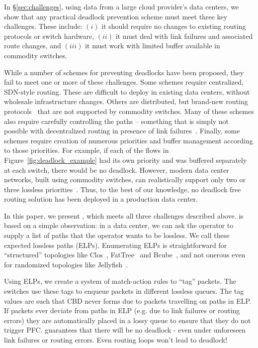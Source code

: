 In \S\ref{sec:challenges}, using data from a large cloud provider's data
centers, we show that any practical deadlock prevention scheme must meet three
key challenges. These include: $(i)$ it should require no changes to existing
routing protocols or switch hardware, $(ii)$ it must deal with link failures and
associated  route changes, and $(iii)$ it must work with limited buffer
available in commodity switches.

While a number of schemes for preventing deadlocks have been proposed, they fail
to meet one or more of these challenges.  Some schemes require centralized,
SDN-style routing.  These are difficult to deploy in existing data centers,
without wholesale infrastructure changes.  Others are distributed, but brand-new
routing protocols~\cite{tcpbolt} that are not supported by commodity switches.
Many of these schemes also require carefully controlling the paths -- something
that is simply not possible with decentralized routing in presence of link
failures~\cite{netpilot}.  Finally, some schemes require creation of numerous
priorities and buffer management according to those priorities. For example, if
each of the flows in Figure~\ref{fig:deadlock_example} had its own priority and
was buffered separately at each switch, there would be no deadlock.  However,
modern data center networks, built using commodity switches, can realistically
support only two or three lossless priorities~\cite{rdmaatscale}.  Thus, to the
best of our knowledge, no deadlock free routing solution has been deployed in a
production data center.  

In this paper, we present \sysname{}, which meets all three challenges described
above. \system is based on a simple observation: in a data center, we can ask
the operator to supply a list of paths that the operator wants to be lossless.
We call these expected lossless paths (ELPs). Enumerating ELPs is
straightforward for ``structured'' topologies like Clos~\cite{clos},
FatTree~\cite{fattree} and Bcube~\cite{bcube}, and not onerous even for
randomized topologies like Jellyfish~\cite{jellyfish}. 

Using ELPs, we create a system of match-action rules to ``tag'' packets. The
switches use these tags to enqueue packets in different lossless queues. The tag
values are such that CBD never forms due to packets travelling on paths in ELP.
If packets ever deviate from paths in ELP (e.g. due to link failures or routing
errors) they are automatically placed in a lossy queue to ensure that they do
not trigger PFC. \system guarantees that there will be no deadlock - even under
unforeseen link failures or routing errors. Even routing loops won't lead to
deadlock!


